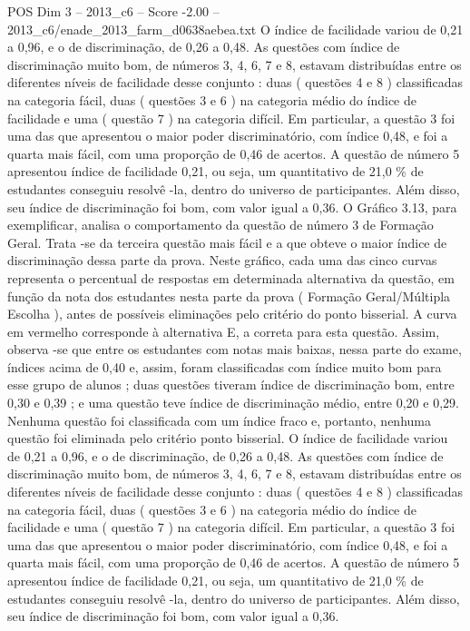 \begin{textsample}{POS Dim 3 – 2013\_c6 – Score -2.00 – 2013\_c6/enade\_2013\_farm\_d0638aebea.txt}
O índice de facilidade variou de 0,21 a 0,96, e o de discriminação, de 0,26 a 0,48.
As questões com índice de discriminação muito bom, de números 3, 4, 6, 7 e 8, estavam distribuídas entre os diferentes níveis de facilidade desse conjunto : duas ( questões 4 e 8 ) classificadas na categoria fácil, duas ( questões 3 e 6 ) na categoria médio do índice de facilidade e uma ( questão 7 ) na categoria difícil.
Em particular, a questão 3 foi uma das que apresentou o maior poder discriminatório, com índice 0,48, e foi a quarta mais fácil, com uma proporção de 0,46 de acertos.
A questão de número 5 apresentou índice de facilidade 0,21, ou seja, um quantitativo de 21,0 \% de estudantes conseguiu resolvê -la, dentro do universo de participantes.
Além disso, seu índice de discriminação foi bom, com valor igual a 0,36.
O Gráfico 3.13, para exemplificar, analisa o comportamento da questão de número 3 de Formação Geral.
Trata -se da terceira questão mais fácil e a que obteve o maior índice de discriminação dessa parte da prova.
Neste gráfico, cada uma das cinco curvas representa o percentual de respostas em determinada alternativa da questão, em função da nota dos estudantes nesta parte da prova ( Formação Geral/Múltipla Escolha ), antes de possíveis eliminações pelo critério do ponto bisserial.
A curva em vermelho corresponde à alternativa E, a correta para esta questão.
Assim, observa -se que entre os estudantes com notas mais baixas, nessa parte do exame, índices acima de 0,40 e, assim, foram classificadas com índice muito bom para esse grupo de alunos ; duas questões tiveram índice de discriminação bom, entre 0,30 e 0,39 ; e uma questão teve índice de discriminação médio, entre 0,20 e 0,29.
Nenhuma questão foi classificada com um índice fraco e, portanto, nenhuma questão foi eliminada pelo critério ponto bisserial.
O índice de facilidade variou de 0,21 a 0,96, e o de discriminação, de 0,26 a 0,48.
As questões com índice de discriminação muito bom, de números 3, 4, 6, 7 e 8, estavam distribuídas entre os diferentes níveis de facilidade desse conjunto : duas ( questões 4 e 8 ) classificadas na categoria fácil, duas ( questões 3 e 6 ) na categoria médio do índice de facilidade e uma ( questão 7 ) na categoria difícil.
Em particular, a questão 3 foi uma das que apresentou o maior poder discriminatório, com índice 0,48, e foi a quarta mais fácil, com uma proporção de 0,46 de acertos.
A questão de número 5 apresentou índice de facilidade 0,21, ou seja, um quantitativo de 21,0 \% de estudantes conseguiu resolvê -la, dentro do universo de participantes.
Além disso, seu índice de discriminação foi bom, com valor igual a 0,36.

\end{textsample}
